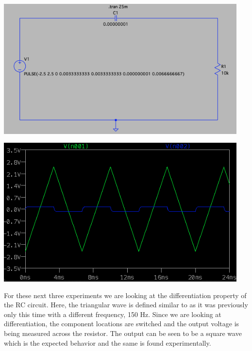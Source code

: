 \documentclass[12pt]{article}
\newcommand{\objects}[2]{%
  \leavevmode\vbox{\hbox{#1}\nointerlineskip\hbox{#2}}%
}
\begin{document}
    \begin{center}
        \objects
            {\includegraphics[width=0.95\textwidth]{4.3.4 LTSpice Circuit.png}}
            \:
            {\includegraphics[width=0.95\textwidth]{4.3.4 LTSpice Output.png}}
    \end{center}
    \par For these next three experiments we are looking at the differentiation property of the RC circuit. Here, the triangular wave is defined similar to as it was previously only this time with a different frequency, 150 Hz. Since we are looking at differentiation, the component locations are switched and the output voltage is being measured across the resistor. The output can be seen to be a square wave which is the expected behavior and the same is found experimentally.
    \newpage
\end{document}

